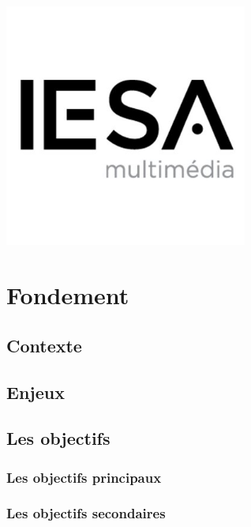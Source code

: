 \documentclass[12pt]{article}
\begin{document}
\begin{titlepage}
\includegraphics [width=0.6\textwidth] {IESA_logo.jpg} %



\vfill %

\end{titlepage}

\tableofcontents{}
\newpage

\section{Fondement}

\subsection{Contexte}

\subsection{Enjeux}

\subsection{Les objectifs}
\subsubsection{Les objectifs principaux}


\subsubsection{Les objectifs secondaires}
\end{document}
